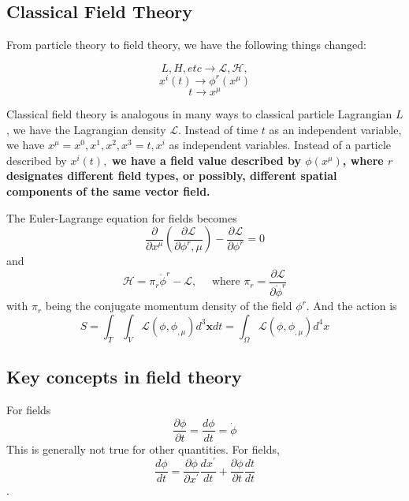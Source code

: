 \subsection{Classical Field Theory}
From particle theory to field theory, we have the following things changed:
\begin{qt}
$$L, H, e t c \rightarrow \mathcal{L}, \mathcal{H},$$ 
\[
x^{i}(t) \rightarrow \phi^{r}\left(x^{\mu}\right)
\]
$$t \rightarrow x^{\mu}$$
\end{qt}
Classical field theory is analogous in many ways to classical particle Lagrangian $L$, we have the Lagrangian density $\mathcal{L}$. Instead of time $t$ as an independent variable, we have $x^{\mu}=x^{0}, x^{1}, x^{2}, x^{3}=t, {x^{i}}$ as independent variables. Instead of a particle described by $x^{i}(t),$ \textbf{we have a field value described by $\phi(x^{\mu})$, where $r$ designates different field types, or possibly, different spatial components of the same vector field.}
\begin{qt}
The Euler-Lagrange equation for fields becomes
\begin{equation}
\frac{\partial}{\partial x^{\mu}}\left(\frac{\partial \mathcal{L}}{\partial \phi^{r}, \mu}\right)-\frac{\partial \mathcal{L}}{\partial \phi^{r}}=0
\end{equation}
and
\begin{equation}
\mathcal{H}=\pi_{r} \dot{\phi}^{r}-\mathcal{L}, \quad \text { where } \pi_{r}=\frac{\partial \mathcal{L}}{\partial \dot{\phi}^{r}}
\end{equation}
with $\pi_r$ being the conjugate momentum density of the field $\phi^r$. And the action is
\begin{equation}
S=\int_{T} \int_{V} \mathcal{L}\left(\phi, \phi_{,\mu}\right) d^{3} \mathbf{x} d t=\int_{\Omega} \mathcal{L}\left(\phi, \phi_{, \mu}\right) d^{4} x
\end{equation}
\end{qt}
\subsection{Key concepts in field theory}
For fields
\begin{equation}
\frac{\partial \phi}{\partial t}=\frac{d \phi}{d t}=\dot{\phi}
\end{equation}
This is generally not true for other quantities. For fields, 
\begin{equation}
\frac{d \phi}{d t}=\frac{\partial \phi}{\partial x^{\prime}} \frac{d x^{\prime}}{d t}+\frac{\partial \phi}{\partial t} \frac{d t}{d t}
\end{equation}
.

